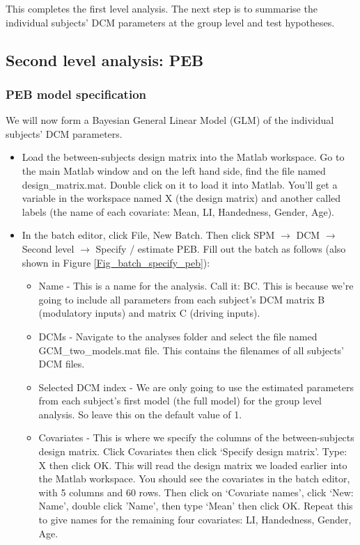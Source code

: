 \documentclass{article}
\begin{document}
This completes the first level analysis. The next step is to summarise the individual subjects' DCM parameters at the group level and test hypotheses.

\subsection{Second level analysis: PEB}
\subsubsection{PEB model specification} \label{GUI_PEBspec}
We will now form a Bayesian General Linear Model (GLM) of the individual subjects' DCM parameters. 
\begin{itemize}
    \item Load the between-subjects design matrix into the Matlab workspace. Go to the main Matlab window and on the left hand side, find the file named design\_matrix.mat. Double click on it to load it into Matlab. You'll get a variable in the workspace named X (the design matrix) and another called labels (the name of each covariate: Mean, LI, Handedness, Gender, Age). 
    
    \item In the batch editor, click File, New Batch. Then click SPM $\rightarrow$ DCM $\rightarrow$ Second level $\rightarrow$ Specify / estimate PEB. Fill out the batch as follows (also shown in Figure \ref{Fig_batch_specify_peb}):
    
    \begin{itemize}
        \item Name - This is a name for the analysis. Call it: BC. This is because we're going to include all parameters from each subject's DCM matrix B (modulatory inputs) and matrix C (driving inputs).
        
        \item DCMs - Navigate to the analyses folder and select the file named  GCM\_two\_models.mat file. This contains the filenames of all subjects' DCM files.
        
        \item Selected DCM index - We are only going to use the estimated parameters from each subject's first model (the full model) for the group level analysis. So leave this on the default value of 1.
        
        \item Covariates - This is where we specify the columns of the  between-subjects design matrix. Click Covariates then click `Specify design matrix'. Type: X then click OK. This will read the design matrix we loaded earlier into the Matlab workspace. You should see the covariates in the batch editor, with 5 columns and 60 rows. Then click on `Covariate names', click `New: Name', double click 'Name', then type `Mean' then click OK.  Repeat this to give names for the remaining four covariates: LI, Handedness, Gender, Age.
        

\end{itemize}
\end{itemize}
\end{document}
